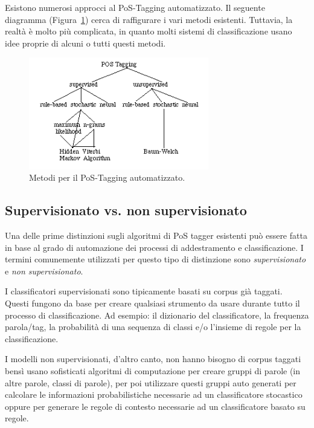 Esistono numerosi approcci al PoS-Tagging automatizzato.
Il seguente diagramma (Figura~\ref{fig:feedforwardNeuralNetwork}) cerca di
raffigurare i vari metodi esistenti. Tuttavia, la realt\`a \`e molto pi\`u
complicata, in quanto molti sistemi di classificazione usano idee proprie di
alcuni o tutti questi metodi.

\begin{figure}[tp]
  \centering
  \begin{center}
    \includegraphics[width=0.7\textwidth]{./images/tagging_overview.png}
  \end{center}
  \caption{Metodi per il PoS-Tagging automatizzato.}
  \label{fig:feedforwardNeuralNetwork}
\end{figure}

\subsection{Supervisionato vs. non supervisionato}
\nocite{BrillMarcus:1993}
\nocite{Brill:1995}
\nocite{Schutze:1993}

Una delle prime distinzioni sugli algoritmi di PoS tagger esistenti pu\`o essere
fatta in base al grado di automazione dei processi di addestramento e classificazione.
I termini comunemente utilizzati per questo tipo di distinzione sono \emph{supervisionato}
e \emph{non supervisionato}.

I classificatori supervisionati sono tipicamente basati su corpus gi\`a taggati.
Questi fungono da base per creare qualsiasi strumento da usare durante tutto il
processo di classificazione. Ad esempio: il dizionario del classificatore, la
frequenza parola/tag, la probabilit\`a di una sequenza di classi e/o l'insieme
di regole per la classificazione.

I modelli non supervisionati, d'altro canto, non hanno bisogno di corpus taggati
bens\`i usano sofisticati algoritmi di computazione per creare gruppi di parole
(in altre parole, classi di parole), per poi utilizzare questi gruppi auto generati
per calcolare le informazioni probabilistiche necessarie ad un classificatore
stocastico oppure per generare le regole di contesto necessarie ad un classificatore
basato su regole.


